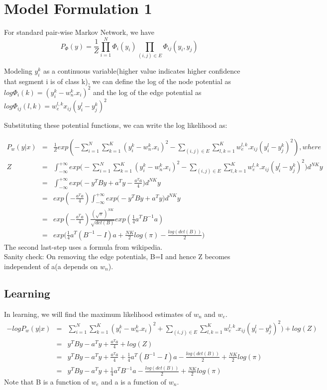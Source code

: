 \documentclass[11pt,a4paper,oneside]{report}
\begin{document}
\tableofcontents
\section{Model Formulation 1}
For standard pair-wise Markov Network, we have 
\begin{equation}
  P_\Phi (y) = \frac{1}{Z} \prod_{i=1}^{N} \Phi_i(y_i) \prod_{(i,j)\in E} \Phi_{ij}(y_i,y_j)
  \end{equation}

Modeling $y_i^k$ as a continuous variable(higher value indicates higher confidence that segment i is of class k), we can define the log of the node potential as 
$ log \Phi_i(k) = (y_i^k -  w_n^k.x_i )^2$  and the log of the edge potential as $ log \Phi_{ij}(l,k) = w_e^{l,k}x_{ij} ( y_i^l -  y_j^k)^2$

Substituting these potential functions, we can write the log likelihood as: 

\begin{eqnarray*}
P_w (y|x) &=& \frac{1}{Z}exp(-\sum_{i=1}^{N} \sum_{k=1}^{K} (y_i^k - w^{k}_{n}.x_{i})^2 - \sum_{(i,j)\in E} \sum_{l,k=1}^{K} w_{e}^{l,k}.x_{ij}(y_i^l - y_j^k)^2), where\\
Z&=&\int_{-\infty}^{+\infty }{exp \bigg( - \sum_{i=1}^{N} \sum_{k=1}^{K} (y_i^k - w^{k}_{n}.x_{i})^2 - \sum_{(i,j)\in E} \sum_{l,k=1}^{K} w_{e}^{l,k}.x_{ij}(y_i^l - y_j^k)^2 \bigg) } d^{NK}y\\
&=&\int_{-\infty}^{+\infty }{exp \bigg(-y^T B y+a^T y-\frac{a^Ta}{4}\bigg) } d^{NK}y\\
&=&exp(-\frac{a^Ta}{4})\int_{-\infty}^{+\infty }{exp \bigg(-y^T B y+a^T y\bigg) } d^{NK}y\\
&=&exp(-\frac{a^Ta}{4})\frac{(\sqrt{\pi})^{NK}}{\sqrt{det(B)}}exp(\frac{1}{4}a^T B^{-1} a)\\
&=&exp\bigg(\frac{1}{4}a^T (B^{-1}-I) a+\frac{NK}{2}log(\pi)-\frac{log(det(B))}{2}\bigg)
\end{eqnarray*}
The second last-step uses a formula from wikipedia. \\
Sanity check: On removing the edge potentials, B=I and hence Z becomes independent of a(a depends on $w_n$).
\subsection{Learning}
In learning, we will find the maximum likelihood estimates of $w_n$ and $w_e$.
\begin{eqnarray*}
-log P_w (y|x) &=& \sum_{i=1}^{N} \sum_{k=1}^{K} (y_i^k - w^{k}_{n}.x_{i})^2 + \sum_{(i,j)\in E} \sum_{l,k=1}^{K} w_{e}^{l,k}.x_{ij}(y_i^l - y_j^k)^2) +log(Z)\\
&=& y^T B y-a^T y +\frac{a^Ta}{4} +log(Z)\\
&=& y^T B y-a^T y +\frac{a^Ta}{4}+\frac{1}{4}a^T (B^{-1} -I)a-\frac{log(det(B))}{2}+\frac{NK}{2}log(\pi)\\
&=& y^T B y-a^T y +\frac{1}{4}a^T B^{-1}a-\frac{log(det(B))}{2}+\frac{NK}{2}log(\pi)
\end{eqnarray*}
Note that B is a function of $w_e$ and a is a function of $w_n$.
\end{document}
